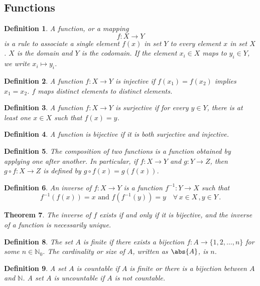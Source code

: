 \documentclass{article}
\theoremstyle{plain}\theoremheaderfont{\normalfont\itshape}\theorembodyfont{\rmfamily}\theoremseparator{.}\newtheorem*{rem}{Remark}\newtheorem*{ex}{Example}\newtheorem*{proof}{Proof}\newtheorem*{altp}{Alternative proof}
\theoremstyle{plain}\theoremheaderfont{\normalfont\bfseries}\theorembodyfont{\rmfamily}\theoremseparator{.}\newtheorem{thm}{Theorem}[section]\newtheorem{lem}[thm]{Lemma}\newtheorem{prop}[thm]{Proposition}\newtheorem*{cor}{Corollary}\newtheorem{defn}[thm]{Definition}\newtheorem{clm}[thm]{Claim}\newtheorem{clminproof}{Claim}
\theoremstyle{break}\theoremheaderfont{\normalfont\itshape}\theorembodyfont{\rmfamily}\theoremseparator{.\medskip}\newtheorem*{proofskip}{Proof}\newtheorem*{exs}{Examples}\newtheorem*{rems}{Remarks}
\theoremstyle{break}\theoremheaderfont{\normalfont\bfseries}\theorembodyfont{\rmfamily}\theoremseparator{.\medskip}\newtheorem{lemskip}[thm]{Lemma}\newtheorem{defnskip}[thm]{Definition}\newtheorem{propskip}[thm]{Proposition}\newtheorem{thmskip}[thm]{Theorem}
\numberwithin{equation}{section}
\begin{document}
	\subsection{Functions}
	\begin{defn}
		A \textit{function}, or a \textit{mapping}
		\[f:X\rightarrow Y\]
		is a rule to associate a single element \(f(x)\) in set \(Y\) to every element \(x\) in set \(X\). \(X\) is the \textit{domain} and \(Y\) is the \textit{codomain}. If the element \(x_i\in X\) \textit{maps to} \(y_i\in Y\), we write \(x_i\mapsto y_i\).
	\end{defn}
	\begin{defn}
		A function \(f:X\rightarrow Y\) is \textit{injective} if \(f(x_1)=f(x_2)\) implies \(x_1=x_2\). \(f\) maps distinct elements to distinct elements.
	\end{defn}
	\begin{defn}
		A function \(f:X\rightarrow Y\) is \textit{surjective} if for every \(y\in Y\), there is at least one \(x\in X\) such that \(f(x)=y\).
	\end{defn}
	\begin{defn}
		A function is \textit{bijective} if it is both surjective and injective.
	\end{defn}
	\begin{defn}
		The \textit{composition of two functions} is a function obtained by applying one after another. In particular, if \(f : X \to Y\) and \(g : Y \to Z\), then \(g\circ f : X \to Z\) is defined by \(g\circ f(x) = g(f(x))\).
	\end{defn}
	\begin{defn}
		An \textit{inverse} of \(f:X\rightarrow Y\) is a function \(f^{-1}: Y\to X\) such that
		\[f^{-1}(f(x))=x\text{ and }f(f^{-1}(y))=y\quad\forall\,x\in X\,,y\in Y\,.\]
	\end{defn}
	\begin{thm}
		The inverse of \(f\) exists if and only if it is bijective, and the inverse of a function is necessarily unique.	
	\end{thm}
	\begin{defn}
		The set \(A\) is \textit{finite} if there exists a bijection \(f:A\to \{1,2,\dots,n\}\) for some \(n\in \mathbb{N}_0\). The \textit{cardinality} or \textit{size} of \(A\), written as \(\abs{A}\), is \(n\).
	\end{defn}
	\begin{defn}
		A set \(A\) is \textit{countable} if \(A\) is finite or there is a bijection between \(A\) and \(\mathbb{N}\). A set \(A\) is \textit{uncountable} if \(A\) is not countable.
	\end{defn}
\end{document}
